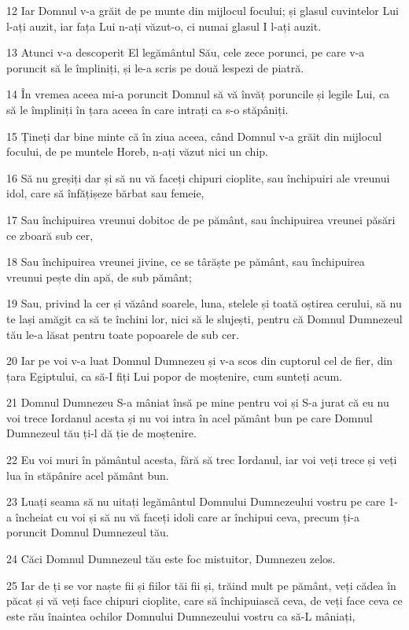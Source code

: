 \par 12 Iar Domnul v-a grăit de pe munte din mijlocul focului; și glasul cuvintelor Lui l-ați auzit, iar fața Lui n-ați văzut-o, ci numai glasul I l-ați auzit.
\par 13 Atunci v-a descoperit El legământul Său, cele zece porunci, pe care v-a poruncit să le împliniți, și le-a scris pe două lespezi de piatră.
\par 14 În vremea aceea mi-a poruncit Domnul să vă învăț poruncile și legile Lui, ca să le împliniți în țara aceea în care intrați ca s-o stăpâniți.
\par 15 Țineți dar bine minte că în ziua aceea, când Domnul v-a grăit din mijlocul focului, de pe muntele Horeb, n-ați văzut nici un chip.
\par 16 Să nu greșiți dar și să nu vă faceți chipuri cioplite, sau închipuiri ale vreunui idol, care să înfățișeze bărbat sau femeie,
\par 17 Sau închipuirea vreunui dobitoc de pe pământ, sau închipuirea vreunei păsări ce zboară sub cer,
\par 18 Sau închipuirea vreunei jivine, ce se târăște pe pământ, sau închipuirea vreunui pește din apă, de sub pământ;
\par 19 Sau, privind la cer și văzând soarele, luna, stelele și toată oștirea cerului, să nu te lași amăgit ca să te închini lor, nici să le slujești, pentru că Domnul Dumnezeul tău le-a lăsat pentru toate popoarele de sub cer.
\par 20 Iar pe voi v-a luat Domnul Dumnezeu și v-a scos din cuptorul cel de fier, din țara Egiptului, ca să-I fiți Lui popor de moștenire, cum sunteți acum.
\par 21 Domnul Dumnezeu S-a mâniat însă pe mine pentru voi și S-a jurat că eu nu voi trece Iordanul acesta și nu voi intra în acel pământ bun pe care Domnul Dumnezeul tău ți-l dă ție de moștenire.
\par 22 Eu voi muri în pământul acesta, fără să trec Iordanul, iar voi veți trece și veți lua în stăpânire acel pământ bun.
\par 23 Luați seama să nu uitați legământul Domnului Dumnezeului vostru pe care 1-a încheiat cu voi și să nu vă faceți idoli care ar închipui ceva, precum ți-a poruncit Domnul Dumnezeul tău.
\par 24 Căci Domnul Dumnezeul tău este foc mistuitor, Dumnezeu zelos.
\par 25 Iar de ți se vor naște fii și fiilor tăi fii și, trăind mult pe pământ, veți cădea în păcat și vă veți face chipuri cioplite, care să închipuiască ceva, de veți face ceva ce este rău înaintea ochilor Domnului Dumnezeului vostru ca să-L mâniați,
